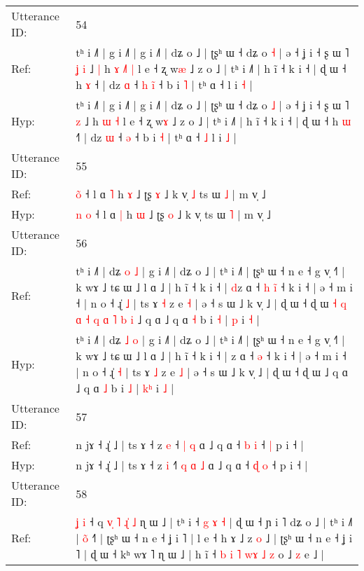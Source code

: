 \documentclass[10pt]{article}
\DeclareRobustCommand{\hl}[1]{{\textcolor{red}{#1}}}
\begin{document}
\begin{longtable}{ll}
 \\
\midrule
Utterance ID: & 54 \\
Ref: & tʰ i ˩˥ | g i ˩˥ | g i ˩˥ | dʑ o ˩ | ʈʂʰ ɯ ˧ dʑ o \hl{˧} | ə ˧ ʝ i ˧ ʂ ɯ ˥\hl{ }\hl{ʝ} \hl{i} ˩\hl{ }\hl{|} h\hl{ }\hl{ɤ} \hl{˩}\hl{˥} \hl{|} l e ˧ ʐ w\hl{æ} ˩ z o ˩ | tʰ i ˩˥ | h ĩ ˧ k i ˧ | ɖ ɯ ˧ h \hl{ɤ} ˧\hl{} | dz \hl{ɑ} ˧\hl{ }\hl{h} \hl{i}\hl{̃} ˧ b i \hl{˥} | tʰ ɑ ˧\hl{}\hl{} l i \hl{˧} |
 \\
Hyp: & tʰ i ˩˥ | g i ˩˥ | g i ˩˥ | dʑ o ˩ | ʈʂʰ ɯ ˧ dʑ o \hl{˩} | ə ˧ ʝ i ˧ ʂ ɯ ˥\hl{}\hl{} \hl{z} ˩\hl{}\hl{} h\hl{}\hl{} \hl{}\hl{ɯ} \hl{˧} l e ˧ ʐ w\hl{ɤ} ˩ z o ˩ | tʰ i ˩˥ | h ĩ ˧ k i ˧ | ɖ ɯ ˧ h \hl{ɯ} ˧\hl{˥} | dz \hl{ɯ} ˧\hl{}\hl{} \hl{}\hl{ə} ˧ b i \hl{˧} | tʰ ɑ ˧\hl{ }\hl{˩} l i \hl{˩} |
 \\
\midrule
Utterance ID: & 55 \\
Ref: & \hl{}\hl{o}\hl{̃} ˧ l ɑ \hl{˥} h \hl{ɤ} ˩ ʈʂ \hl{ɤ} ˩ k v̩\hl{ }\hl{˩} ts ɯ \hl{˩} | m v̩ ˩
 \\
Hyp: & \hl{n}\hl{ }\hl{o} ˧ l ɑ \hl{|} h \hl{ɯ} ˩ ʈʂ \hl{o} ˩ k v̩\hl{}\hl{} ts ɯ \hl{˥} | m v̩ ˩
 \\
\midrule
Utterance ID: & 56 \\
Ref: & tʰ i ˩˥ | dʑ \hl{o} \hl{˩} | g i ˩˥ | dʑ o ˩ | tʰ i ˩˥ | ʈʂʰ ɯ ˧ n e ˧ g v̩ ˧˥ | k wɤ ˩ tɕ ɯ ˩ l ɑ ˩ | h ĩ ˧ k i ˧ | \hl{d}z ɑ ˧\hl{ }\hl{h} \hl{i}\hl{̃} ˧ k i ˧ | ə ˧ m i ˧ | n o ˧ ɻ̍ \hl{˩} | ts ɤ \hl{˧} z e \hl{˧} | ə ˧ s ɯ ˩ k v̩ ˩ | ɖ ɯ ˧ ɖ ɯ\hl{ }\hl{˧}\hl{ }\hl{q}\hl{ }\hl{ɑ}\hl{ }\hl{˧}\hl{ }\hl{q}\hl{ }\hl{ɑ}\hl{ }\hl{˥}\hl{ }\hl{b}\hl{ }\hl{i} ˩ q ɑ ˩ q ɑ \hl{˧} b i \hl{˧} | \hl{}\hl{p} i \hl{˧} |
 \\
Hyp: & tʰ i ˩˥ | dʑ \hl{˩} \hl{o} | g i ˩˥ | dʑ o ˩ | tʰ i ˩˥ | ʈʂʰ ɯ ˧ n e ˧ g v̩ ˧˥ | k wɤ ˩ tɕ ɯ ˩ l ɑ ˩ | h ĩ ˧ k i ˧ | \hl{}z ɑ ˧\hl{}\hl{} \hl{}\hl{ə} ˧ k i ˧ | ə ˧ m i ˧ | n o ˧ ɻ̍ \hl{˧} | ts ɤ \hl{˩} z e \hl{˩} | ə ˧ s ɯ ˩ k v̩ ˩ | ɖ ɯ ˧ ɖ ɯ\hl{}\hl{}\hl{}\hl{}\hl{}\hl{}\hl{}\hl{}\hl{}\hl{}\hl{}\hl{}\hl{}\hl{}\hl{}\hl{}\hl{}\hl{} ˩ q ɑ ˩ q ɑ \hl{˩} b i \hl{˩} | \hl{k}\hl{ʰ} i \hl{˩} |
 \\
\midrule
Utterance ID: & 57 \\
Ref: & n jɤ ˧ ɻ̍ ˩ | ts ɤ ˧ z \hl{e} ˧\hl{}\hl{}\hl{} \hl{|} \hl{q} ɑ ˩ q ɑ ˧ \hl{b} \hl{i} ˧\hl{ }\hl{|} p i ˧ |
 \\
Hyp: & n jɤ ˧ ɻ̍ ˩ | ts ɤ ˧ z \hl{i} ˧\hl{˥}\hl{ }\hl{q} \hl{ɑ} \hl{˩} ɑ ˩ q ɑ ˧ \hl{ɖ} \hl{o} ˧\hl{}\hl{} p i ˧ |
 \\
\midrule
Utterance ID: & 58 \\
Ref: & \hl{ʝ}\hl{ }\hl{i} ˧ q\hl{ }\hl{v}\hl{̩}\hl{ }\hl{˥} \hl{ɻ}\hl{̍} \hl{˩} ɳ ɯ ˩ | tʰ i ˧ \hl{g}\hl{ }\hl{ɤ} \hl{˧} | ɖ ɯ ˧ ɲ i ˥ dʑ o ˩ | tʰ i ˩˥ | \hl{}\hl{o}\hl{̃} ˧\hl{˥} | ʈʂʰ ɯ ˧ n e ˧ ʝ i ˥ | l e ˧ h ɤ ˩ z \hl{o} ˩ | ʈʂʰ ɯ ˧ n e ˧ ʝ i ˥ | ɖ ɯ ˧ kʰ wɤ ˥ ɳ ɯ ˩ | h ĩ ˧ \hl{b} \hl{i} \hl{˥} \hl{w}\hl{ɤ} \hl{˩} \hl{z} o ˩ \hl{}\hl{z} e ˩ |

\end{longtable}
\end{document}

